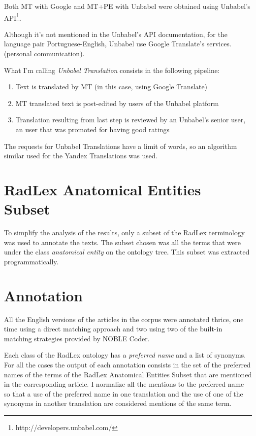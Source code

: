 Both MT with Google and MT+PE with Unbabel were obtained using Unbabel's API\footnote{http://developers.unbabel.com/}. 

Although it's not mentioned in the Unbabel's API documentation, for the language pair Portuguese-English, Unbabel use Google Translate's services. (personal communication).

What I'm calling \textit{Unbabel Translation} consists in the following pipeline:

\begin{enumerate}
\item Text is translated by MT (in this case, using Google Translate)
\item MT translated text is post-edited by users of the Unbabel platform 
\item Translation resulting from last step is reviewed by an Unbabel's senior user, an user that was promoted for having good ratings
\end{enumerate}

The requests for Unbabel Translations have a limit of words, so an algorithm similar used for the Yandex Translations was used. 

\section{RadLex Anatomical Entities Subset}

To simplify the analysis of the results, only a subset of the RadLex terminology was used to annotate the texts. The subset chosen was all the terms that were under the class \textit{anatomical entity} on the ontology tree. This subset was extracted programmatically. 

\section{Annotation}

All the English versions of the articles in the corpus were annotated thrice, one time using a direct matching approach and two using two of the built-in matching strategies provided by NOBLE Coder. 

Each class of the RadLex ontology has a \textit{preferred name} and a list of synonyms. For all the cases the output of each annotation consists in the set of the preferred names of the terms of the RadLex Anatomical Entities Subset that are mentioned in the corresponding article. I normalize all the mentions to the preferred name so that a use of the preferred name in one translation and the use of one of the synonyms in another translation are considered mentions of the same term. 

